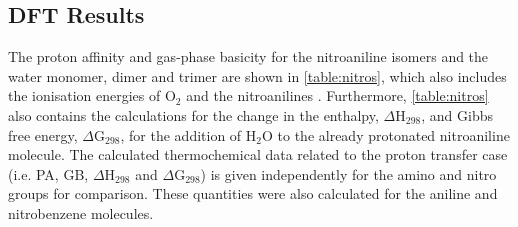 \subsection{DFT Results}
The proton affinity and gas-phase basicity for the nitroaniline isomers and the water monomer, dimer and trimer are shown in \autoref{table:nitros}, which also includes the ionisation energies of O$_2$ and the nitroanilines \cite{linstrom2015nist}. 
Furthermore, \autoref{table:nitros} also contains the calculations for the change in the enthalpy, $\Delta$H$_{298}$,  and Gibbs free energy, $\Delta$G$_{298}$, for the addition of H$_2$O to the already protonated nitroaniline molecule.
The calculated thermochemical data related to the proton transfer case (i.e. PA, GB, $\Delta$H$_{298}$ and $\Delta$G$_{298}$) is given independently for the amino and nitro groups for comparison. 
These quantities were also calculated for the aniline and nitrobenzene molecules.



